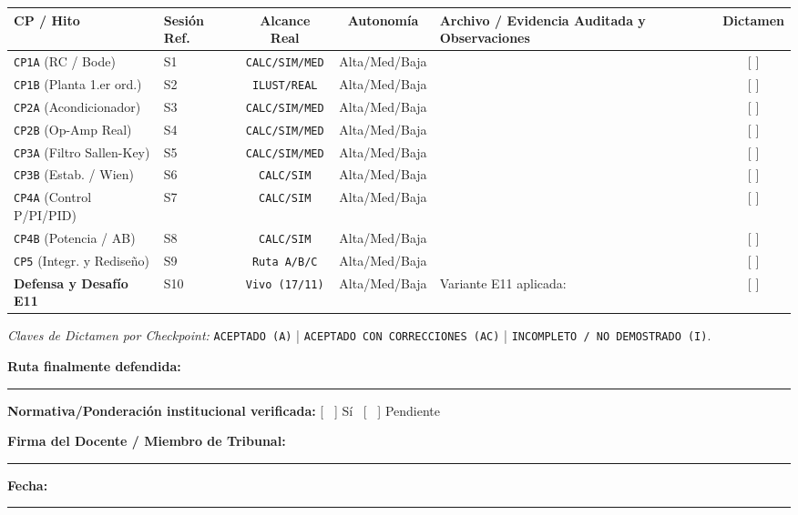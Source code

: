 \documentclass[11pt, a4paper]{article}
\begin{document}
\begin{center}
\footnotesize
\begin{tabularx}{\textwidth}{@{} l l c c L c @{}}
\toprule
\textbf{CP / Hito} & \textbf{Sesión Ref.} & \textbf{Alcance Real} & \textbf{Autonomía} & \textbf{Archivo / Evidencia Auditada y Observaciones} & \textbf{Dictamen} \\ \midrule
\texttt{CP1A} (RC / Bode) & S1 & \texttt{CALC/SIM/MED} & Alta/Med/Baja & & [ \quad ] \\ \addlinespace[5pt]
\texttt{CP1B} (Planta 1.er ord.) & S2 & \texttt{ILUST/REAL} & Alta/Med/Baja & & [ \quad ] \\ \addlinespace[5pt]
\texttt{CP2A} (Acondicionador) & S3 & \texttt{CALC/SIM/MED} & Alta/Med/Baja & & [ \quad ] \\ \addlinespace[5pt]
\texttt{CP2B} (Op-Amp Real) & S4 & \texttt{CALC/SIM/MED} & Alta/Med/Baja & & [ \quad ] \\ \addlinespace[5pt]
\texttt{CP3A} (Filtro Sallen-Key) & S5 & \texttt{CALC/SIM/MED} & Alta/Med/Baja & & [ \quad ] \\ \addlinespace[5pt]
\texttt{CP3B} (Estab. / Wien) & S6 & \texttt{CALC/SIM} & Alta/Med/Baja & & [ \quad ] \\ \addlinespace[5pt]
\texttt{CP4A} (Control P/PI/PID) & S7 & \texttt{CALC/SIM} & Alta/Med/Baja & & [ \quad ] \\ \addlinespace[5pt]
\texttt{CP4B} (Potencia / AB) & S8 & \texttt{CALC/SIM} & Alta/Med/Baja & & [ \quad ] \\ \addlinespace[5pt]
\texttt{CP5} (Integr. y Rediseño) & S9 & \texttt{Ruta A/B/C} & Alta/Med/Baja & & [ \quad ] \\ \addlinespace[5pt]
\textbf{Defensa y Desafío E11} & S10 & \texttt{Vivo (17/11)} & Alta/Med/Baja & Variante E11 aplicada: & [ \quad ] \\ \bottomrule
\end{tabularx}
\end{center}
\footnotesize \textit{Claves de Dictamen por Checkpoint:} \texttt{ACEPTADO (A)} | \texttt{ACEPTADO CON CORRECCIONES (AC)} | \texttt{INCOMPLETO / NO DEMOSTRADO (I)}.

\par\vspace{0.5cm}
\begin{tcolorbox}[colback=white, colframe=black, title=\textbf{Constancia de Cierre de Revisión Técnica}]
    \textbf{Ruta finalmente defendida:} \rule{2.5cm}{0.4pt} \hfill \textbf{Normativa/Ponderación institucional verificada:} [ \ ] Sí \ [ \ ] Pendiente
    \par\vspace{0.8cm}
    \textbf{Firma del Docente / Miembro de Tribunal:} \rule{6cm}{0.4pt} \hfill \textbf{Fecha:} \rule{3cm}{0.4pt}
\end{tcolorbox}
\end{document}

